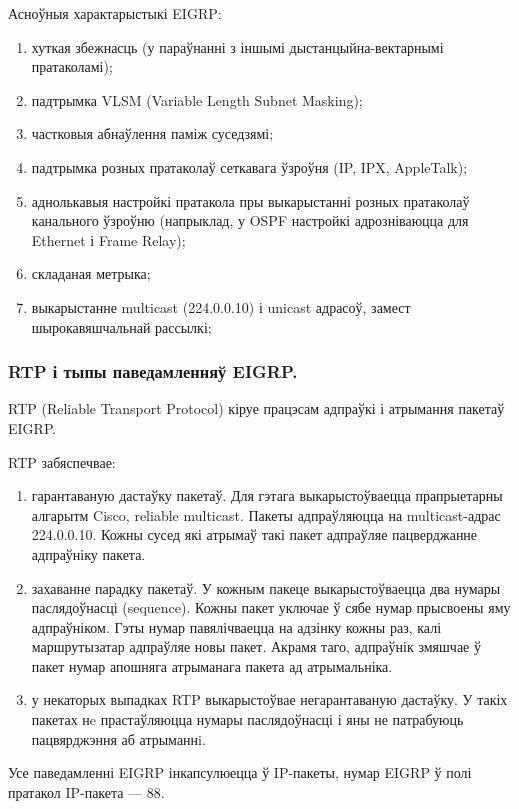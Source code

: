 Асноўныя характарыстыкі EIGRP:
\begin{enumerate}
     \item хуткая збежнасць (у параўнанні з іншымі дыстанцыйна-вектарнымі пратаколамі);
     \item падтрымка VLSM (Variable Length Subnet Masking);
     \item частковыя абнаўлення паміж суседзямі;
     \item падтрымка розных пратаколаў сеткавага ўзроўня (IP, IPX, AppleTalk);
     \item аднолькавыя настройкі пратакола пры выкарыстанні розных пратаколаў канального ўзроўню (напрыклад, у OSPF настройкі адрозніваюцца для Ethernet і Frame Relay);
     \item складаная метрыка;
     \item выкарыстанне multicast (224.0.0.10) і unicast адрасоў, замест шырокавяшчальнай рассылкі;
\end{enumerate}

\subsubsection{RTP і тыпы паведамленняў EIGRP.}

RTP (Reliable Transport Protocol) кіруе працэсам адпраўкі і атрымання пакетаў EIGRP.

RTP забяспечвае:
\begin{enumerate}
    \item гарантаваную дастаўку пакетаў. Для гэтага выкарыстоўваецца прапрыетарны алгарытм Cisco, reliable multicast. Пакеты адпраўляюцца на multicast-адрас 224.0.0.10. Кожны сусед які атрымаў такі пакет адпраўляе пацверджанне адпраўніку пакета.
    \item захаванне парадку пакетаў. У кожным пакеце выкарыстоўваецца два нумары паслядоўнасці (sequence). Кожны пакет уключае ў сябе нумар прысвоены яму адпраўніком. Гэты нумар павялічваецца на адзінку кожны раз, калі маршрутызатар адпраўляе новы пакет. Акрамя таго, адпраўнік змяшчае ў пакет нумар апошняга атрыманага пакета ад атрымальніка.
    \item у некаторых выпадках RTP выкарыстоўвае негарантаваную дастаўку. У такіх пакетах нe прастаўляюцца нумары паслядоўнасці і яны не патрабуюць пацвярджэння аб атрыманнi.
\end{enumerate}

Усе паведамленні EIGRP інкапсулюецца ў IP-пакеты, нумар EIGRP ў полі пратакол IP-пакета --- 88.

